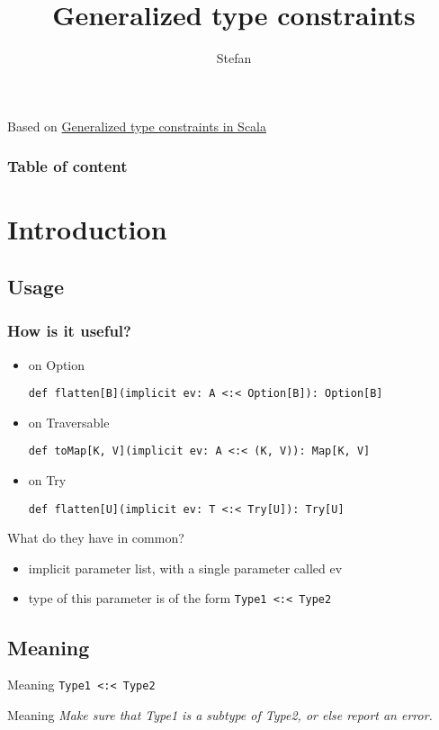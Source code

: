 \documentclass[11pt]{beamer}
\author{Stefan}
\title{Generalized type constraints}
\date{}
\begin{document}
\begin{frame}
\titlepage
Based on \href{http://blog.bruchez.name/2015/11/generalized-type-constraints-in-scala.html}{Generalized type constraints in Scala}
\end{frame}

\begin{frame} 
	\frametitle{Table of content} 
	\tableofcontents 
\end{frame}

\section{Introduction} 
\subsection{Usage}

\begin{frame}[fragile]
\frametitle{How is it useful?}
\begin{itemize}
\item on Option
\begin{lstlisting} 
def flatten[B](implicit ev: A <:< Option[B]): Option[B]
\end{lstlisting} %

\item on Traversable
\begin{lstlisting} 
def toMap[K, V](implicit ev: A <:< (K, V)): Map[K, V]
\end{lstlisting} %

\item on Try
\begin{lstlisting} 
def flatten[U](implicit ev: T <:< Try[U]): Try[U]
\end{lstlisting} 
\end{itemize}
\end{frame}

\begin{frame}{What do they have in common?}
\begin{itemize}
\item implicit parameter list, with a single parameter called ev
\item type of this parameter is of the form \lstinline{Type1 <:< Type2}
\end{itemize}
\end{frame}


\subsection{Meaning}
\begin{frame}[fragile]{Meaning}
\lstinline {Type1 <:< Type2} \newline\newline
\begin{block}{Meaning} %
\textit{Make sure that Type1 is a subtype of Type2, or else report an error.}
\end{block}
\end{frame}
\end{document}
